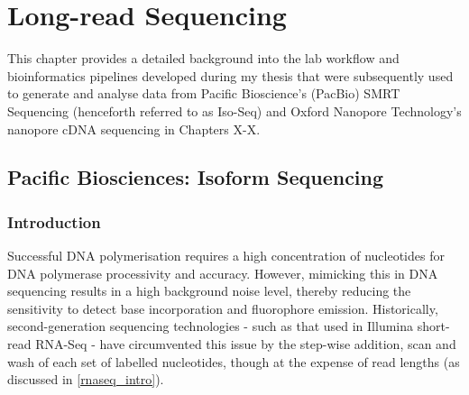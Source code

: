 \chapter{Long-read Sequencing}\label{ch: long_read_sequencing}

This chapter provides a detailed background into the lab workflow and bioinformatics pipelines developed during my thesis that were subsequently used to generate and analyse data from Pacific Bioscience's (PacBio) SMRT Sequencing (henceforth referred to as Iso-Seq) and Oxford Nanopore Technology's nanopore cDNA sequencing in Chapters X-X. 

\section{Pacific Biosciences: Isoform Sequencing}
\label{sec:pb_isoform_sequencing}

\subsection{Introduction}
Successful DNA polymerisation requires a high concentration of nucleotides for DNA polymerase processivity and accuracy. However, mimicking this in DNA sequencing results in a high background noise level, thereby reducing the sensitivity to detect base incorporation and fluorophore emission. Historically, second-generation sequencing technologies - such as that used in Illumina short-read RNA-Seq - have circumvented this issue by the step-wise addition, scan and wash of each set of labelled nucleotides, though at the expense of read lengths (as discussed in \cref{rnaseq_intro}). 

